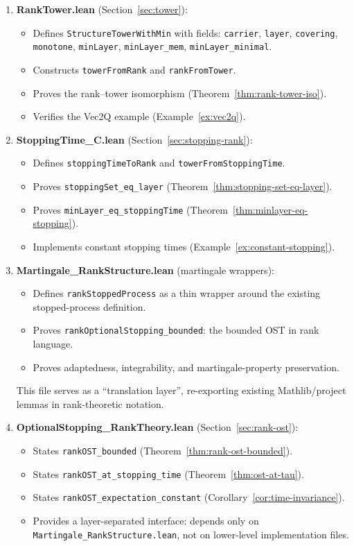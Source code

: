 \documentclass[11pt]{article}
\theoremstyle{definition}
\theoremstyle{remark}
\begin{document}
\begin{enumerate}
\item \textbf{RankTower.lean} (Section~\ref{sec:tower}):
  \begin{itemize}
  \item Defines \texttt{StructureTowerWithMin} with fields: \texttt{carrier}, \texttt{layer}, \texttt{covering}, \texttt{monotone}, \texttt{minLayer}, \texttt{minLayer\_mem}, \texttt{minLayer\_minimal}.
  \item Constructs \texttt{towerFromRank} and \texttt{rankFromTower}.
  \item Proves the rank--tower isomorphism (Theorem~\ref{thm:rank-tower-iso}).
  \item Verifies the Vec2Q example (Example~\ref{ex:vec2q}).
  \end{itemize}

\item \textbf{StoppingTime\_C.lean} (Section~\ref{sec:stopping-rank}):
  \begin{itemize}
  \item Defines \texttt{stoppingTimeToRank} and \texttt{towerFromStoppingTime}.
  \item Proves \texttt{stoppingSet\_eq\_layer} (Theorem~\ref{thm:stopping-set-eq-layer}).
  \item Proves \texttt{minLayer\_eq\_stoppingTime} (Theorem~\ref{thm:minlayer-eq-stopping}).
  \item Implements constant stopping times (Example~\ref{ex:constant-stopping}).
  \end{itemize}

\item \textbf{Martingale\_RankStructure.lean} (martingale wrappers):
  \begin{itemize}
  \item Defines \texttt{rankStoppedProcess} as a thin wrapper around the existing stopped-process definition.
  \item Proves \texttt{rankOptionalStopping\_bounded}: the bounded OST in rank language.
  \item Proves adaptedness, integrability, and martingale-property preservation.
  \end{itemize}
  This file serves as a ``translation layer'', re-exporting existing Mathlib/project lemmas in rank-theoretic notation.

\item \textbf{OptionalStopping\_RankTheory.lean} (Section~\ref{sec:rank-ost}):
  \begin{itemize}
  \item States \texttt{rankOST\_bounded} (Theorem~\ref{thm:rank-ost-bounded}).
  \item States \texttt{rankOST\_at\_stopping\_time} (Theorem~\ref{thm:ost-at-tau}).
  \item States \texttt{rankOST\_expectation\_constant} (Corollary~\ref{cor:time-invariance}).
  \item Provides a layer-separated interface: depends only on \texttt{Martingale\_RankStructure.lean}, not on lower-level implementation files.
  \end{itemize}
\end{enumerate}
\end{document}
